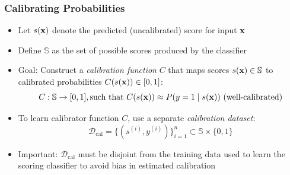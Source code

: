 \documentclass[11pt,compress,t,notes=noshow, xcolor=table]{beamer}
\begin{document}

		
		

\begin{frame}[t]
  \frametitle{Calibrating Probabilities}

  \begin{itemize}
    \item Let $s(\mathbf{x})$ denote the predicted (uncalibrated) score for input $\mathbf{x}$
    \item Define $\mathbb{S}$ as the set of possible scores produced by the classifier
    \item Goal: Construct a \emph{calibration function} $C$ that maps scores $s(\mathbf{x}) \in \mathbb{S}$ to calibrated probabilities $C(s(\mathbf{x})) \in [0,1]$:
    \[
      C: \mathbb{S} \to [0, 1], \text{such that } C(s(\mathbf{x})) \approx P(y = 1 \mid s(\mathbf{x})) \text{ (well-calibrated)}
    \]
    \item To learn calibrator function $C$, use a separate \emph{calibration dataset}:
    \[
      \mathcal{D}_{\text{cal}} = \{ (s^{(i)}, y^{(i)}) \}_{i=1}^{n} \subset \mathbb{S} \times \{0, 1\}
    \]
    \item Important: $\mathcal{D}_{\text{cal}}$ must be disjoint from the training data used to learn the scoring classifier to avoid bias in estimated calibration
  \end{itemize}

\end{frame}
\end{document}
